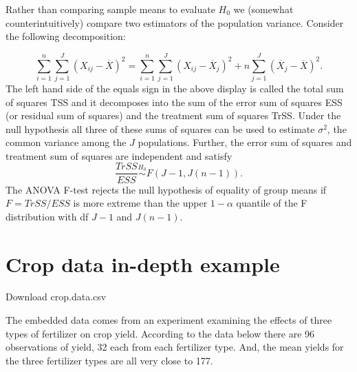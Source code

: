 \documentclass[]{book}
\newenvironment{Shaded}{\begin{snugshade}}{\end{snugshade}}
\newcommand{\KeywordTok}[1]{\textcolor[rgb]{0.13,0.29,0.53}{\textbf{{#1}}}}
\newcommand{\DataTypeTok}[1]{\textcolor[rgb]{0.13,0.29,0.53}{{#1}}}
\newcommand{\DecValTok}[1]{\textcolor[rgb]{0.00,0.00,0.81}{{#1}}}
\newcommand{\StringTok}[1]{\textcolor[rgb]{0.31,0.60,0.02}{{#1}}}
\newcommand{\OtherTok}[1]{\textcolor[rgb]{0.56,0.35,0.01}{{#1}}}
\newcommand{\NormalTok}[1]{{#1}}
\begin{document}
Rather than comparing sample means to evaluate \(H_0\) we (somewhat
counterintuitively) compare two estimators of the population variance.
Consider the following decomposition:

\[\sum_{i=1}^n\sum_{j=1}^J(X_{ij} - \overline X)^2 = \sum_{i=1}^n\sum_{j=1}^J (X_{ij} - \overline X_j)^2 + n\sum_{j=1}^J (\overline X_j - \overline X)^2.\]
The left hand side of the equals sign in the above display is called the
total sum of squares TSS and it decomposes into the sum of the error sum
of squares ESS (or residual sum of squares) and the treatment sum of
squares TrSS. Under the null hypothesis all three of these sums of
squares can be used to estimate \(\sigma^2\), the common variance among
the \(J\) populations. Further, the error sum of squares and treatment
sum of squares are independent and satisfy
\[\frac{TrSS}{ESS} \stackrel{H_0}{\sim}F(J-1, J(n-1)).\] The ANOVA
F-test rejects the null hypothesis of equality of group means if
\(F = TrSS/ESS\) is more extreme than the upper \(1-\alpha\) quantile of
the F distribution with df \(J-1\) and \(J(n-1)\).

\section{Crop data in-depth example}\label{crop-data-in-depth-example}

Download crop.data.csv

The embedded data comes from an experiment examining the effects of
three types of fertilizer on crop yield. According to the data below
there are 96 observations of yield, 32 each from each fertilizer type.
And, the mean yields for the three fertilizer types are all very close
to 177.

\begin{Shaded}
\end{Shaded}
\end{document}
